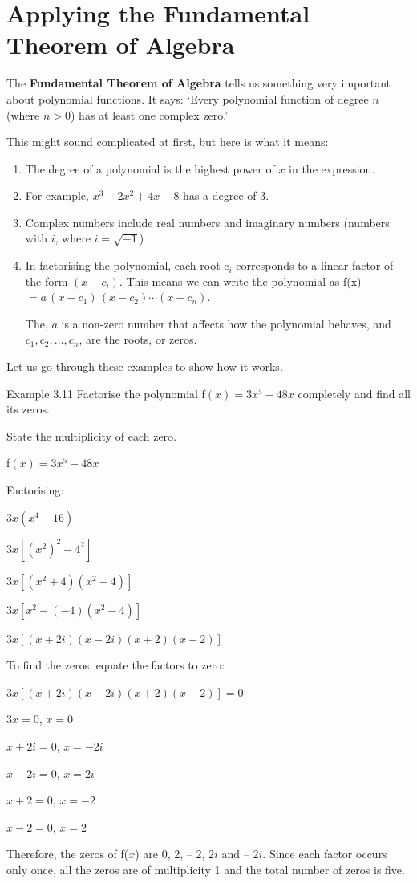 \section{Applying the Fundamental Theorem of Algebra}

The \textbf{Fundamental Theorem of Algebra} tells us something very important about
polynomial functions. It says: `Every polynomial function of degree $n$ (where $n >
0$) has at least one complex zero.'

This might sound complicated at first, but here is what it means:
\begin{enumerate}
  \item The degree of a polynomial is the highest power of $x$ in the expression.
  \item For example, $x^3 - 2x^2 + 4x - 8$ has a degree of 3.
  \item Complex numbers include real numbers and imaginary numbers (numbers
  with $i$, where $i = \sqrt{-1}$)
  \item In factorising the polynomial, each root c$_i$ corresponds to a linear factor of
  the form $(x - c_i)$. This means we can write the polynomial as f(x) $= a\,(x -
  c_1)\,(x - c_2) \cdots (x - c_n)$.

  The, $a$ is a non-zero number that affects how the polynomial behaves, and
  $c_1, c_2, \ldots, c_n$, are the roots, or zeros.
\end{enumerate}
Let us go through these examples to show how it works.

\begin{example}{Example 3.11}
Factorise the polynomial f$(x) = 3x^5 - 48x$ completely and find all its zeros.

State the multiplicity of each zero.

\solution
f$(x) = 3x^5 - 48x$

Factorising:

$3x(x^4 - 16)$

$3x[(x^2)^2 - 4^2]$

$3x[(x^2 + 4)(x^2 - 4)]$

$3x[x^2 - (-4)(x^2 - 4)]$

$3x[(x + 2i)(x - 2i)(x + 2)(x - 2)]$

To find the zeros, equate the factors to zero:

$3x[(x + 2i)(x - 2i)(x + 2)(x - 2)] = 0$

$3x = 0$, $x = 0$

$x + 2i = 0$, $x = -2i$

$x - 2i = 0$, $x = 2i$

$x + 2 = 0$, $x = -2$

$x - 2 = 0$, $x = 2$

Therefore, the zeros of f($x$) are 0, 2, -- 2, 2$i$ and -- 2$i$. Since each factor occurs
only once, all the zeros are of multiplicity 1 and the total number of zeros is five.
\end{example}

